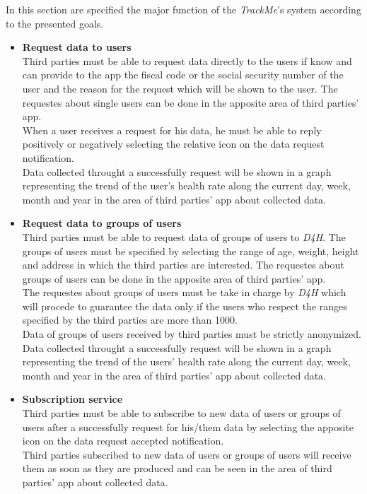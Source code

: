 In this section are specified the major function of the \textit{TrackMe}'s system according to the presented goals.
\begin {itemize}
	\item {\textbf{Request data to users}\\ Third parties must be able to request data directly to the users if know and can provide to the app the fiscal code or the social security number of the user and the reason for the request which will be shown to the user. The requestes about single users can be done in the apposite area of third parties' app. \\ When a user receives a request for his data, he must be able to reply positively or negatively selecting the relative icon on the data request notification. \\ Data collected throught a successfully request will be shown in a graph representing the trend of the user's health rate along the current day, week, month and year in the area of third parties' app about collected data. }

	\item {\textbf{Request data to groups of users}\\ Third parties must be able to request data of groups of users to \textit{D4H}. The groups of users must be specified by selecting the range of age, weight, height and address in which the third parties are interested. The requestes about groups of users can be done in the apposite area of third parties' app.  \\ The requestes about groups of users must be take in charge by \textit{D4H} which will procede to guarantee the data only if the users who respect the ranges specified by the third parties are more than 1000. \\ Data of groups of users received by third parties must be strictly anonymized. \\ Data collected throught a successfully request will be shown in a graph representing the trend of the users' health rate along the current day, week, month and year in the area of third parties' app about collected data.}

	\item {\textbf{Subscription service}\\ Third parties must be able to subscribe to new data of users or groups of users after a successfully request for his/them data by selecting the apposite icon on the data request accepted notification. \\ Third parties subscribed to new data of users or groups of users will receive them as soon as they are produced and can be seen in the area of third parties' app about collected data.}


\end{itemize}
